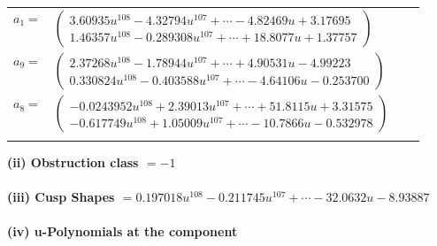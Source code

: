 \documentclass[1p]{elsarticle_modified}
\theoremstyle{definition}
\begin{document}
\begin{tabular}{m{7pt} m{180pt} m{7pt} m{180pt} }
\flushright $a_{1}=$&$\begin{pmatrix}3.60935 u^{108}-4.32794 u^{107}+\cdots-4.82469 u+3.17695\\1.46357 u^{108}-0.289308 u^{107}+\cdots+18.8077 u+1.37757\end{pmatrix}$ \\
\flushright $a_{9}=$&$\begin{pmatrix}2.37268 u^{108}-1.78944 u^{107}+\cdots+4.90531 u-4.99223\\0.330824 u^{108}-0.403588 u^{107}+\cdots-4.64106 u-0.253700\end{pmatrix}$ \\
\flushright $a_{8}=$&$\begin{pmatrix}-0.0243952 u^{108}+2.39013 u^{107}+\cdots+51.8115 u+3.31575\\-0.617749 u^{108}+1.05009 u^{107}+\cdots-10.7866 u-0.532978\end{pmatrix}$\\&\end{tabular}
\flushleft \textbf{(ii) Obstruction class $= -1$}\\~\\
\flushleft \textbf{(iii) Cusp Shapes $= 0.197018 u^{108}-0.211745 u^{107}+\cdots-32.0632 u-8.93887$}\\~\\
\newpage\renewcommand{\arraystretch}{1}
\flushleft \textbf{(iv) u-Polynomials at the component}\newline \\
\end{document}
